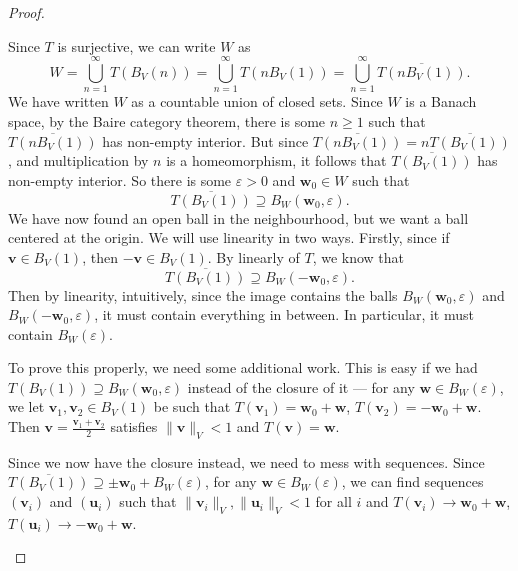 \documentclass[a4paper]{article}
\begin{document}
\begin{proof}
\begin{enumerate}
      Since $T$ is surjective, we can write $W$ as
      \[
        W = \bigcup_{n = 1}^\infty T(B_V(n)) = \bigcup_{n = 1}^{\infty} T(nB_V(1)) = \bigcup_{n = 1}^\infty \overline{T(nB_V(1))}.
      \]
      We have written $W$ as a countable union of closed sets. Since $W$ is a Banach space, by the Baire category theorem, there is some $n \geq 1$ such that $\overline{T(n B_V(1))}$ has non-empty interior. But since $\overline{T(n B_V(1))} = n \overline{T(B_V(1))}$, and multiplication by $n$ is a homeomorphism, it follows that $\overline{T(B_V(1))}$ has non-empty interior. So there is some $\varepsilon > 0$ and $\mathbf{w}_0 \in W$ such that
      \[
        \overline{T(B_V(1))} \supseteq B_W(\mathbf{w}_0, \varepsilon).
      \]
      We have now found an open ball in the neighbourhood, but we want a ball centered at the origin. We will use linearity in two ways. Firstly, since if $\mathbf{v}\in B_V(1)$, then $-\mathbf{v}\in B_V(1)$. By linearly of $T$, we know that
      \[
        \overline{T(B_V(1))} \supseteq B_W(-\mathbf{w}_0, \varepsilon).
      \]
      Then by linearity, intuitively, since the image contains the balls $B_W(\mathbf{w}_0, \varepsilon)$ and $B_W(-\mathbf{w}_0, \varepsilon)$, it must contain everything in between. In particular, it must contain $B_W(\varepsilon)$.

      To prove this properly, we need some additional work. This is easy if we had $T(B_V(1)) \supseteq B_W(\mathbf{w}_0, \varepsilon)$ instead of the closure of it --- for any $\mathbf{w}\in B_W(\varepsilon)$, we let $\mathbf{v}_1, \mathbf{v}_2\in B_V(1)$ be such that $T(\mathbf{v}_1) = \mathbf{w}_0 + \mathbf{w}$, $T(\mathbf{v}_2) = -\mathbf{w}_0 + \mathbf{w}$. Then $\mathbf{v} = \frac{\mathbf{v}_1 + \mathbf{v}_2}{2}$ satisfies $\|\mathbf{v}\|_V < 1$ and $T(\mathbf{v}) = \mathbf{w}$.

      Since we now have the closure instead, we need to mess with sequences. Since $\overline{T(B_V(1))} \supseteq \pm \mathbf{w}_0 + B_W(\varepsilon)$, for any $\mathbf{w}\in B_W(\varepsilon)$, we can find sequences $(\mathbf{v}_i)$ and $(\mathbf{u}_i)$ such that $\|\mathbf{v}_i\|_V, \|\mathbf{u}_i\|_V < 1$ for all $i$ and $T(\mathbf{v}_i) \to \mathbf{w}_0 + \mathbf{w}$, $T(\mathbf{u}_i) \to -\mathbf{w}_0 + \mathbf{w}$.


\end{enumerate}
\end{proof}
\end{document}
